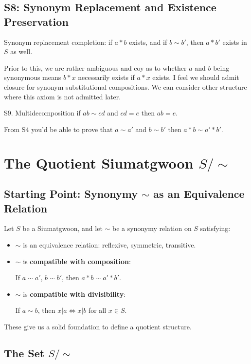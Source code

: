 \subsection{S8: Synonym Replacement and Existence Preservation}

Synonym replacement completion: if $a*b$ exists, and if $b\sim b'$, then $a*b'$ exists in $S$ as well.

Prior to this, we are rather ambiguous and coy as to whether $a$ and $b$ being synonymous means $b*x$ necessarily exists if $a*x$ exists. I feel we should admit closure for synonym substitutional compositions. We can consider other structure where this axiom is not admitted later.

S9. Multidecomposition if $ab \sim cd$ and $cd = e$ then $ab =e$. 

From S4 you'd be able to prove that $a \sim a'$ and $b\sim b'$ then $a * b \sim a' * b'$.

\section{The Quotient Siumatgwoon $S/\sim$}

\subsection{Starting Point: Synonymy $\sim$ as an Equivalence Relation}

Let $S$ be a Siumatgwoon, and let $\sim$ be a synonymy relation on $S$ satisfying:

\begin{itemize}
\item $\sim$ is an equivalence relation: reflexive, symmetric, transitive.
\item $\sim$ is \textbf{compatible with composition}:
    
    If $a\sim a'$, $b\sim b'$, then $a*b\sim a'*b'$.
    
\item $\sim$ is \textbf{compatible with divisibility}:
    
    If $a\sim b$, then $x|a \iff x|b$ for all $x\in S$.
\end{itemize}

These give us a solid foundation to define a quotient structure.

\subsection{The Set $S/\sim$}

